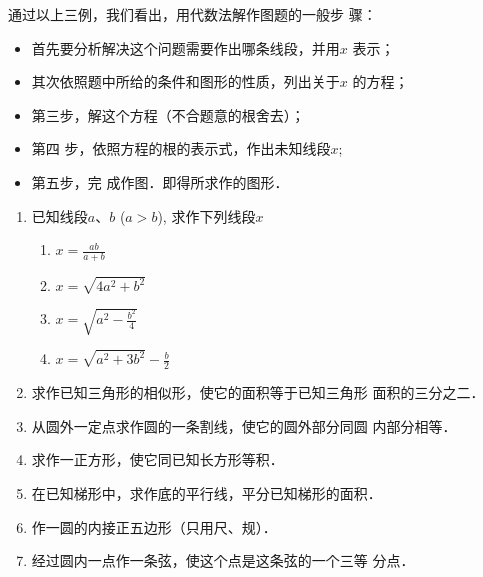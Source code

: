 \begin{figure}[htp]
    \centering
{}
    \caption{}
\end{figure}


通过以上三例，我们看出，用代数法解作图题的一般步
骤：
\begin{itemize}
    \item 首先要分析解决这个问题需要作出哪条线段，并用$x$
表示；
\item 其次依照题中所给的条件和图形的性质，列出关于$x$
的方程；
\item 第三步，解这个方程（不合题意的根舍去）；
\item 第四
步，依照方程的根的表示式，作出未知线段$x$; 
\item 第五步，完
成作图．即得所求作的图形．
\end{itemize}



\begin{ex}
\begin{enumerate}
    \item 已知线段$a$、$b$ ($a>b$), 求作下列线段$x$
\begin{multicols}{2}
    \begin{enumerate}
        \item $x=\frac{ab}{a+b}$
        \item $x=\sqrt{4a^2+b^2}$
        \item $x=\sqrt{a^2-\frac{b^2}{4}}$
        \item $x=\sqrt{a^2+3b^2}-\frac{b}{2}$
    \end{enumerate}
\end{multicols}
    \item 求作已知三角形的相似形，使它的面积等于已知三角形
    面积的三分之二．
    \item 从圆外一定点求作圆的一条割线，使它的圆外部分同圆
    内部分相等．
    \item 求作一正方形，使它同已知长方形等积．
    \item 在已知梯形中，求作底的平行线，平分已知梯形的面积．
    \item 作一圆的内接正五边形（只用尺、规）．
    \item 经过圆内一点作一条弦，使这个点是这条弦的一个三等
分点．
\end{enumerate}
\end{ex}



